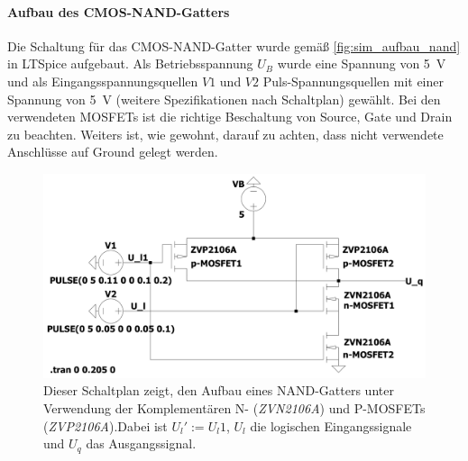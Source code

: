 \documentclass[12pt,english,ngerman]{scrartcl}
\begin{document}
\paragraph{Aufbau des CMOS-NAND-Gatters}
Die Schaltung für das CMOS-NAND-Gatter wurde gemäß \autoref{fig:sim_aufbau_nand} in LTSpice aufgebaut.
Als Betriebsspannung $U_B$ wurde eine Spannung von \SI{5}{\volt} und als Eingangsspannungsquellen $V1$
und $V2$
Puls-Spannungsquellen mit einer Spannung von \SI{5}{\volt} (weitere Spezifikationen nach Schaltplan) gewählt.
Bei den verwendeten MOSFETs ist die richtige Beschaltung von Source, Gate und Drain zu beachten.
Weiters ist, wie gewohnt, darauf zu achten, dass nicht verwendete Anschlüsse auf Ground gelegt werden.
\begin{figure}[H]
  \centering
    \includegraphics[width=\textwidth, height=6cm,keepaspectratio]{./simdaten_lab/cmos/nand/schaltung.png}
  \caption{Dieser Schaltplan zeigt, den Aufbau eines NAND-Gatters unter
    Verwendung der Komplementären N- (\textit{ZVN2106A}) und P-MOSFETs
    (\textit{ZVP2106A}).Dabei ist $U_l':=U_l1$, $U_l$ die logischen
  Eingangssignale und $U_q$ das Ausgangssignal.}
  \label{fig:sim_aufbau_nand}
\end{figure}
\end{document}

